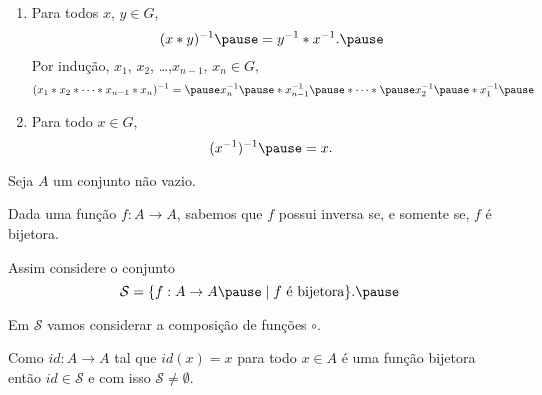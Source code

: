 \documentclass{beamer}
\begin{document}
    \begin{frame}
        \begin{proposicao}
            \begin{enumerate}[label={\roman*})]

                \conti

                \item Para todos $x$, $y \in G$,\pause
                \[
                    (x*y)^{-1} \pause = y^{-1}*x^{-1}.\pause
                \]
                Por indução, \pause $x_1$, $x_2$, \dots ,$x_{n-1}$, $x_n \in G$,\pause
                \[
                    (x_1*x_2*\cdots *x_{n-1}*x_{n})^{-1} = \pause x^{-1}_{n}\pause *x^{-1}_{n-1}\pause *\cdots *\pause x^{-1}_2\pause *x^{-1}_1\pause
                \]
                \item Para todo $x \in G$, \pause
                \[
                    (x^{-1})^{-1} \pause = x.
                \]
            \end{enumerate}
        \end{proposicao}
    \end{frame}

         \begin{frame}
        Seja $A$ um conjunto não vazio.\pause

        \vspace{.3cm}

        Dada uma função $f : A \to A$, sabemos que $f$ possui inversa \pause se, e somente se, $f$ é bijetora.\pause

        \vspace{.3cm}

        Assim considere o conjunto\pause
        \[
        \mathcal{S} = \{ f : A \to A \pause \mid f \mbox{ é bijetora}\}.\pause
        \]

        Em $\mathcal{S}$ vamos considerar a composição de funções $\circ$.\pause

        \vspace{.3cm}

        Como $id : A \to A$ tal que $id(x) = x$ para todo $x \in A$ \pause é uma função bijetora \pause então $id \in \mathcal{S}$ \pause e com isso $\mathcal{S} \ne \emptyset$.
    \end{frame}
\end{document}
